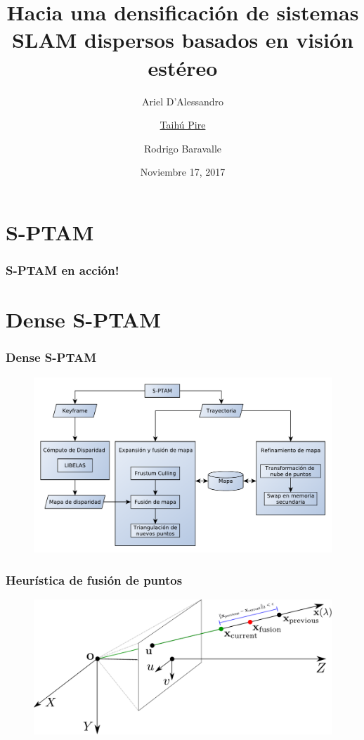 \documentclass[compress]{beamer}
\title{Hacia una densificación de sistemas SLAM	dispersos basados en visión estéreo}
\author{Ariel D'Alessandro \and \underline{Taihú Pire} \and Rodrigo Baravalle}
\institute{	CIFASIS - CONICET - UNR}
\date{\scriptsize{Noviembre 17, 2017}}
\begin{document}
\frame{\titlepage}

\section{S-PTAM}

\begin{frame}
	\frametitle{S-PTAM en acción!}
	\centering
	
\end{frame}


\section{Dense S-PTAM}

\begin{frame}
	\frametitle{Dense S-PTAM}
	\begin{figure}[htb]
		\centering
		\includegraphics[width=\columnwidth]{images/dense_diagram.pdf}
	\end{figure}
\end{frame}

\begin{frame}
	\frametitle{Heurística de fusión de puntos}
	\begin{figure}[htb]
		\centering
		\includegraphics[width=\columnwidth]{images/map_fusion.pdf}
	\end{figure}
\end{frame}
\end{document}
